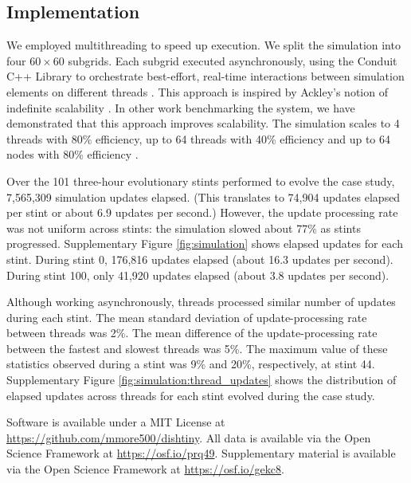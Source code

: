 \subsection{Implementation}

We employed multithreading to speed up execution.
We split the simulation into four $60\times60$ subgrids.
Each subgrid executed asynchronously, using the Conduit C++ Library to orchestrate best-effort, real-time interactions between simulation elements on different threads \citep{moreno2021conduit}.
This approach is inspired by Ackley's notion of indefinite scalability \citep{ackley2014indefinitely}.
In other work benchmarking the system, we have demonstrated that this approach improves scalability.
The simulation scales to 4 threads with 80\% efficiency, up to 64 threads with 40\% efficiency and up to 64 nodes with 80\% efficiency \citep{moreno2021conduit}.

Over the 101 three-hour evolutionary stints performed to evolve the case study, 7,565,309 simulation updates elapsed.
(This translates to 74,904 updates elapsed per stint or about 6.9 updates per second.)
However, the update processing rate was not uniform across stints: the simulation slowed about 77\% as stints progressed.
Supplementary Figure \ref{fig:simulation} shows elapsed updates for each stint.
During stint 0, 176,816 updates elapsed (about 16.3 updates per second).
During stint 100, only 41,920 updates elapsed (about 3.8 updates per second).

Although working asynchronously, threads processed similar number of updates during each stint.
The mean standard deviation of update-processing rate between threads was 2\%.
The mean difference of the update-processing rate between the fastest and slowest threads was 5\%.
The maximum value of these statistics observed during a stint was 9\% and 20\%, respectively, at stint 44.
Supplementary Figure \ref{fig:simulation:thread_updates} shows the distribution of elapsed updates across threads for each stint evolved during the case study.

Software is available under a MIT License at \url{https://github.com/mmore500/dishtiny}.
All data is available via the Open Science Framework at \url{https://osf.io/prq49}.
Supplementary material is available via the Open Science Framework at \url{https://osf.io/gekc8}.
